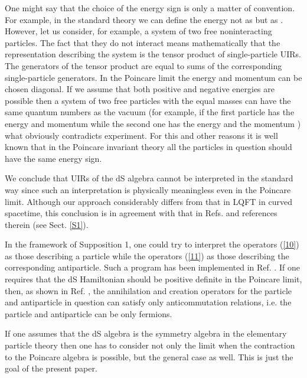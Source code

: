 \documentclass[a4paper,12pt]{article}%
\begin{document}
One might say that the choice of the energy sign is
only a matter of convention. For example, in the
standard theory we can define the energy not as
\coordHE{} but as 
\coordHE{}. However, let us consider,
for example, a system of two free noninteracting
particles. The fact that they do not interact means
mathematically that the representation describing
the system is the tensor product of single-particle
UIRs. The generators of the tensor product are equal
to sums of the corresponding single-particle
generators. In the Poincare limit the energy and
momentum can be chosen diagonal. If we assume that
both positive and negative energies are possible 
then a system of two free particles with the equal
masses can have the same quantum numbers as the
vacuum (for example, if the first particle has the
energy \coordHE{} and momentum \coordHE{} while the second
one has the energy \coordHE{} and the momentum \coordHE{})
what obviously contradicts experiment. For this
and other reasons it is well known that in the
Poincare invariant theory all the particles in
question should have the same energy sign.

We conclude that UIRs of the dS algebra cannot be 
interpreted in the standard way since such an
interpretation is physically meaningless even in
the Poincare limit. Although our approach 
considerably differs from that in LQFT in curved
spacetime, this conclusion is in agreement with
that in Refs. \cite{Narlikar,Susskind} and references 
therein (see Sect. \ref{S1}). 

In the framework of Supposition 1, one could try to
interpret the operators (\ref{10}) as those describing
a particle while the operators (\ref{11}) as those
describing the corresponding antiparticle. Such a
program has been implemented in Ref. \cite{hep}.
If one requires that the dS Hamiltonian should be
positive definite in the Poincare limit, then, as shown in Ref.
\cite{hep}, the annihilation and creation operators for
the particle and antiparticle in question can satisfy
only anticommutation relations, i.e. the particle and
antiparticle can be only fermions. 

If one assumes that the dS algebra
is the symmetry algebra in the elementary particle theory
then one has to consider not only the limit when
the contraction to the Poincare algebra is possible, but
the general case as well. This is just the goal of the 
present paper.
\end{document}

